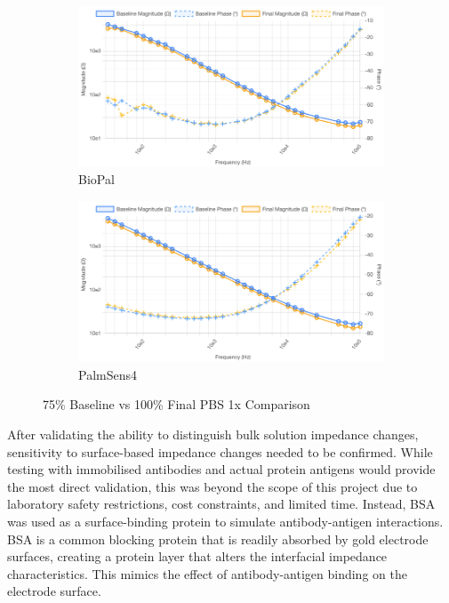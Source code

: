 \begin{figure}[H]
    \centering
    \begin{subfigure}{0.48\textwidth}
        \includegraphics[width=\textwidth]{PBS_75_cropped.png}   
        \caption{BioPal}
        \label{fig:75_pbs_biopal}
    \end{subfigure}
    \hfill
    \begin{subfigure}{0.48\textwidth}
        \includegraphics[width=\textwidth]{PalmSens_75.png}
        \caption{PalmSens4}
        \label{fig:75_pbs_palmsens}
    \end{subfigure}
    \caption{ 75\% Baseline vs 100\% Final PBS 1x Comparison}
    \label{fig:75_pbs_comparison}
\end{figure}

After validating the ability to distinguish bulk solution impedance changes, sensitivity to surface-based impedance changes needed to be confirmed. While testing with immobilised antibodies and actual protein antigens would provide the most direct validation, this was beyond the scope of this project due to laboratory safety restrictions, cost constraints, and limited time. Instead, BSA was used as a surface-binding protein to simulate antibody-antigen interactions. BSA is a common blocking protein that is readily absorbed by gold electrode surfaces, creating a protein layer that alters the interfacial impedance characteristics. This mimics the effect of antibody-antigen binding on the electrode surface.

